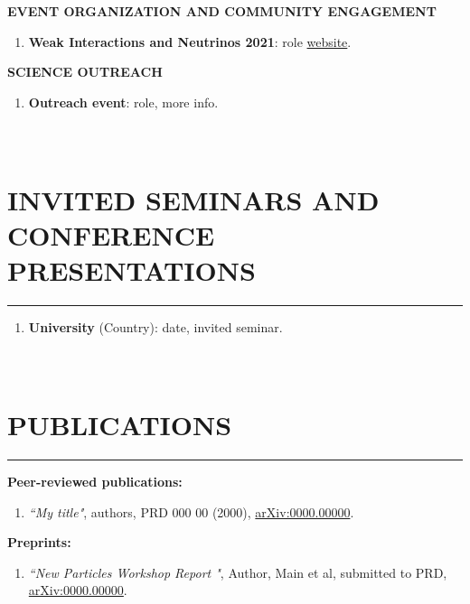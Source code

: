 \documentclass[a4paper,10pt]{article}
\newcommand{\subheader}[1]{\textcolor{linkcolour}{\footnotesize\textbf{#1}}}
\begin{document}
\subheader{EVENT ORGANIZATION AND COMMUNITY ENGAGEMENT}
\begin{enumerate}[label={\tiny$\bullet$}]

\item \textbf{Weak Interactions and Neutrinos 2021}: role \href{address}{website}.

\end{enumerate}

\subheader{SCIENCE OUTREACH}
\begin{enumerate}[label={\tiny$\bullet$}]

\item \textbf{Outreach event}: role, more info.

\end{enumerate}

\section{\\ INVITED SEMINARS AND CONFERENCE PRESENTATIONS}
\vspace{-3ex}\noindent\rule{\textwidth}{0.7pt}

\begin{enumerate}

\item \textbf{University} (Country): date, invited seminar.
\end{enumerate}

\section{\\PUBLICATIONS}
\vspace{-3ex}\noindent\rule{\textwidth}{0.7pt}

{\textbf{Peer-reviewed publications:}}
\begin{enumerate}
    \item \textit{``My title"}, authors, PRD 000 00 (2000), \href{https://arxiv.org/abs/0000.00000}{arXiv:0000.00000}.

\end{enumerate}

{ \textbf{Preprints:}}
\begin{enumerate}
\item \textit{``New Particles Workshop Report
"}, Author, Main et al, submitted to PRD, \href{https://arxiv.org/abs/0000.00000}{arXiv:0000.00000}.
\end{enumerate}
\end{document}
